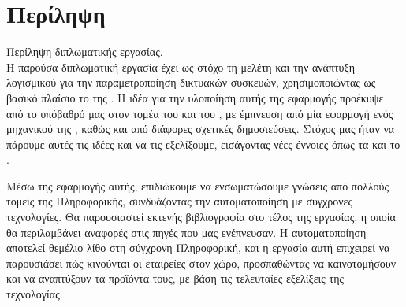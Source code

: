 \chapter*{Περίληψη}

Περίληψη διπλωματικής εργασίας.\\

\noindent Η παρούσα διπλωματική εργασία έχει ως στόχο τη μελέτη και την ανάπτυξη λογισμικού για την παραμετροποίηση δικτυακών συσκευών, χρησιμοποιώντας ως βασικό πλαίσιο το  της . 
Η ιδέα για την υλοποίηση αυτής της εφαρμογής προέκυψε από το υπόβαθρό μας στον τομέα του  και του ,
με έμπνευση από μία εφαρμογή ενός μηχανικού της , 
καθώς και από διάφορες σχετικές δημοσιεύσεις. Στόχος μας ήταν να πάρουμε αυτές τις ιδέες και να τις εξελίξουμε, εισάγοντας νέες έννοιες όπως τα 
 και το .

Μέσω της εφαρμογής αυτής, επιδιώκουμε να ενσωματώσουμε γνώσεις από πολλούς τομείς της Πληροφορικής, συνδυάζοντας την αυτοματοποίηση με σύγχρονες τεχνολογίες. 
Θα παρουσιαστεί εκτενής βιβλιογραφία στο τέλος της εργασίας, η οποία θα περιλαμβάνει αναφορές στις πηγές που μας ενέπνευσαν. Η αυτοματοποίηση αποτελεί θεμέλιο λίθο στη σύγχρονη Πληροφορική, και η εργασία αυτή επιχειρεί να παρουσιάσει πώς κινούνται οι εταιρείες στον χώρο, προσπαθώντας να καινοτομήσουν και να αναπτύξουν τα προϊόντα τους, με βάση τις τελευταίες εξελίξεις της τεχνολογίας.